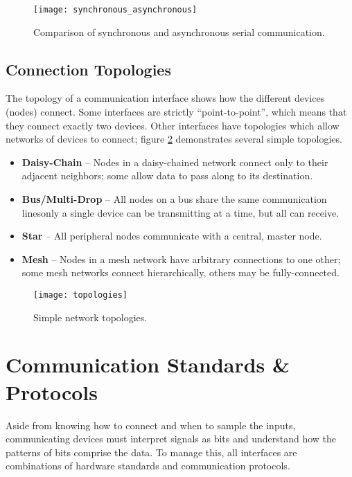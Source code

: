 \documentclass[openany,11pt,fleqn]{book} %
\begin{document}
\begin{figure}[]
    \centering\texttt{[image: synchronous\_asynchronous]}
    \caption{Comparison of synchronous and asynchronous serial communication.}
    \label{synchronous_asynchronous}
\end{figure}

\subsection{Connection Topologies} 
The topology of a communication interface shows how the different devices (nodes) connect. Some interfaces are strictly ``point-to-point'', which means that they connect exactly two devices. Other interfaces have topologies which allow networks of devices to connect; figure \ref{topologies} demonstrates several simple topologies. 

\begin{itemize}
    \item \textbf{Daisy-Chain} -- Nodes in a daisy-chained network connect only to their adjacent neighbors; some allow data to pass along to its destination. 
    \item \textbf{Bus/Multi-Drop} -- All nodes on a bus share the same communication lines\textemdash only a single device can be transmitting at a time, but all can receive.
    \item \textbf{Star} -- All peripheral nodes communicate with a central, master node.
    \item \textbf{Mesh} -- Nodes in a mesh network have arbitrary connections to one other; some mesh networks connect hierarchically, others may be fully-connected.    
\end{itemize}



\begin{figure}[]
    \centering\texttt{[image: topologies]}
    \caption{Simple network topologies.}
    \label{topologies}
\end{figure}

\section{Communication Standards \& Protocols}

Aside from knowing how to connect and when to sample the inputs, communicating devices must interpret signals as bits and understand how the patterns of bits comprise the data. To manage this, all interfaces are combinations of hardware standards and communication protocols. 
\end{document}
